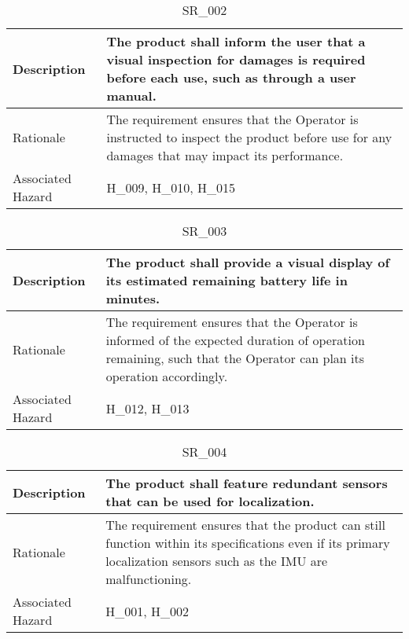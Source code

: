 \documentclass{article}
\begin{document}
\begin{table}[!h]
\begin{center}
\caption {SR\_002} 
\label{SR_002}
\begin{tabular}{ | m{3cm} | m{11cm} | }
\hline
Description & The product shall inform the user that a visual inspection for damages is required before each use, such as through a user manual.
 \\
\hline
Rationale & The requirement ensures that the Operator is instructed to inspect the product before use for any damages that may impact its performance. \\
\hline
Associated Hazard & H\_009, H\_010, H\_015 \\
\hline
\end{tabular}
\end{center}
\end{table}

\begin{table}[!h]
\begin{center}
\caption {SR\_003} 
\label{SR_003}
\begin{tabular}{ | m{3cm} | m{11cm} | }
\hline
Description & The product shall provide a visual display of its estimated remaining battery life in minutes.
 \\
\hline
Rationale & The requirement ensures that the Operator is informed of the expected duration of operation remaining, such that the Operator can plan its operation accordingly. \\
\hline
Associated Hazard & H\_012, H\_013 \\
\hline
\end{tabular}
\end{center}
\end{table}

\begin{table}[!h]
\begin{center}
\caption {SR\_004} 
\label{SR_004}
\begin{tabular}{ | m{3cm} | m{11cm} | }
\hline
Description & The product shall feature redundant sensors that can be used for localization.
 \\
\hline
Rationale & The requirement ensures that the product can still function within its specifications even if its primary localization sensors such as the IMU are malfunctioning. \\
\hline
Associated Hazard & H\_001, H\_002 \\
\hline
\end{tabular}
\end{center}
\end{table}
\end{document}
